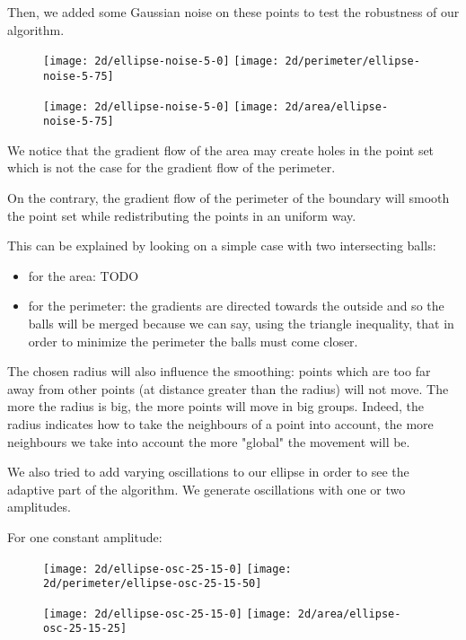 Then, we added some Gaussian noise on these points to test the robustness of our
algorithm.

\begin{figure}[H]
    \centering

    \texttt{[image: 2d/ellipse-noise-5-0]}
    \texttt{[image: 2d/perimeter/ellipse-noise-5-75]}
    \label{fig:ellipse_noise_perimeter_flow}

    \texttt{[image: 2d/ellipse-noise-5-0]}
    \texttt{[image: 2d/area/ellipse-noise-5-75]}
    \label{fig:ellipse_noise_area_flow}
\end{figure}

We notice that the gradient flow of the area may create holes in the point set
which is not the case for the gradient flow of the perimeter.

On the contrary, the gradient flow of the perimeter of the boundary will smooth
the point set while redistributing the points in an uniform way.

This can be explained by looking on a simple case with two intersecting balls:
\begin{itemize}
    \item for the area: TODO
    \item for the perimeter: the gradients are directed towards the outside
        and so the balls will be merged because we can say, using the triangle
        inequality, that in order to minimize the perimeter the balls must come
        closer.
\end{itemize}

The chosen radius will also influence the smoothing: points which are too far
away from other points (at distance greater than the radius) will not move. The
more the radius is big, the more points will move in big groups. Indeed, the
radius indicates how to take the neighbours of a point into account, the more
neighbours we take into account the more "global" the movement will be.

We also tried to add varying oscillations to our ellipse in order to see the
adaptive part of the algorithm. We generate oscillations with one or two
amplitudes.

For one constant amplitude:

\begin{figure}[H]
    \centering

    \texttt{[image: 2d/ellipse-osc-25-15-0]}
    \texttt{[image: 2d/perimeter/ellipse-osc-25-15-50]}
    \label{fig:ellipse_osc_perimeter_flow}

    \texttt{[image: 2d/ellipse-osc-25-15-0]}
    \texttt{[image: 2d/area/ellipse-osc-25-15-25]}
    \label{fig:ellipse_osc_area_flow}
\end{figure}

